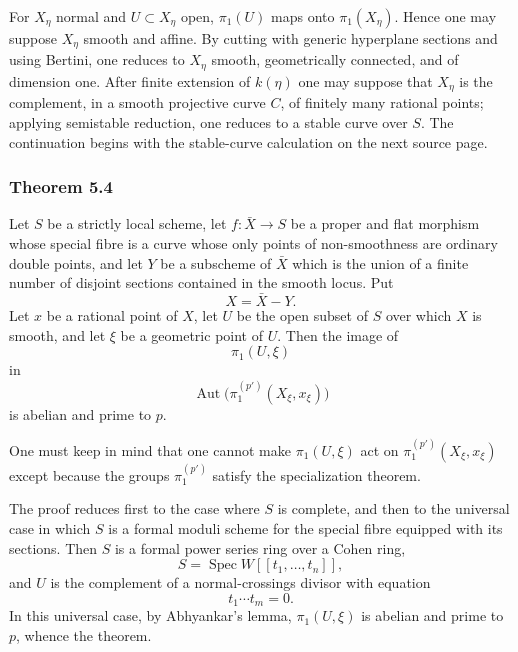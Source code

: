 \documentclass[11pt]{article}
\providecommand{\Spec}{\operatorname{Spec}}
\providecommand{\Aut}{\operatorname{Aut}}
\providecommand{\Hom}{\operatorname{Hom}}
\begin{document}
For $X_\eta$ normal and $U\subset X_\eta$ open, $\pi_1(U)$ maps onto $\pi_1(X_\eta)$. Hence one may suppose $X_\eta$ smooth and affine. By cutting with generic hyperplane sections and using Bertini, one reduces to $X_\eta$ smooth, geometrically connected, and of dimension one. After finite extension of $k(\eta)$ one may suppose that $X_\eta$ is the complement, in a smooth projective curve $C$, of finitely many rational points; applying semistable reduction, one reduces to a stable curve over $S$. The continuation begins with the stable-curve calculation on the next source page.



\providecommand{\cA}{\mathcal A}
\providecommand{\cV}{\mathcal V}
\providecommand{\cF}{\mathcal F}
\providecommand{\Hom}{\operatorname{Hom}}
\providecommand{\coker}{\operatorname{coker}}
\providecommand{\codim}{\operatorname{codim}}
\providecommand{\Coker}{\operatorname{Coker}}
\providecommand{\Picard}{\operatorname{Pic}}
\providecommand{\End}{\operatorname{End}}
\providecommand{\Prof}{\operatorname{prof}}
\providecommand{\Ima}{\operatorname{Im}}
\providecommand{\Frob}{\operatorname{Frob}}
\providecommand{\cQ}{\mathcal Q}
\providecommand{\Et}{\mathrm{et}}
\providecommand{\profp}{\widehat{\mathbb Z}^{(p')}}


\subsubsection*{Theorem 5.4}
Let $S$ be a strictly local scheme, let $f:\bar X\to S$ be a proper and flat morphism whose special fibre is a curve whose only points of non-smoothness are ordinary double points, and let $Y$ be a subscheme of $\bar X$ which is the union of a finite number of disjoint sections contained in the smooth locus. Put
\[
 X=\bar X-Y.
\]
Let $x$ be a rational point of $X$, let $U$ be the open subset of $S$ over which $X$ is smooth, and let $\xi$ be a geometric point of $U$. Then the image of
\[
 \pi_1(U,\xi)
\]
in
\[
 \Aut\bigl(\pi_1^{(p')}(X_\xi,x_\xi)\bigr)
\]
is abelian and prime to $p$.

One must keep in mind that one cannot make $\pi_1(U,\xi)$ act on $\pi_1^{(p')}(X_\xi,x_\xi)$ except because the groups $\pi_1^{(p')}$ satisfy the specialization theorem.

The proof reduces first to the case where $S$ is complete, and then to the universal case in which $S$ is a formal moduli scheme for the special fibre equipped with its sections. Then $S$ is a formal power series ring over a Cohen ring,
\[
 S=\Spec W[[t_1,\ldots,t_n]],
\]
and $U$ is the complement of a normal-crossings divisor with equation
\[
 t_1\cdots t_m=0.
\]
In this universal case, by Abhyankar's lemma, $\pi_1(U,\xi)$ is abelian and prime to $p$, whence the theorem.
\end{document}
